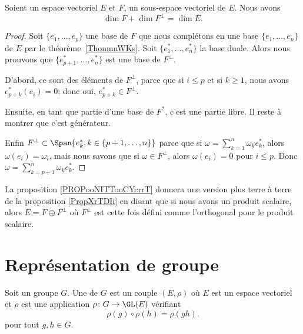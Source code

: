\begin{proposition} \label{PropXrTDIi}
	Soient un espace vectoriel \( E\) et \( F\), un sous-espace vectoriel de \( E\). Nous avons
	\begin{equation}
		\dim F+\dim F^{\perp}=\dim E.
	\end{equation}
\end{proposition}

\begin{proof}
	Soit \( \{ e_1,\ldots, e_p \}\) une base de \( F\) que nous complétons en une base \( \{ e_1,\ldots, e_n \}\) de \( E\) par le théorème~\ref{ThonmnWKs}. Soit \( \{ e_1^*,\ldots, e^*_n \}\) la base duale. Alors nous prouvons que \( \{ e^*_{p+1},\ldots, e_n^* \}\) est une base de \( F^{\perp}\).

	D'abord, ce sont des éléments de \( F^{\perp}\), parce que si \( i\leq p\) et si \( k\geq 1\), nous avons \( e^*_{p+k}(e_i)=0\); donc oui, \( e^*_{p+k}\in F^{\perp}\).

	Ensuite, en tant que partie d'une base de \( F^*\), c'est une partie libre. Il reste à montrer que c'est générateur.


	Enfin \( F^{\perp}\subset\Span\{ e_{k}^*, k \in \{p+1, \dots, n\}\}\) parce que si \( \omega=\sum_{k=1}^n\omega_ke_k^*\), alors \( \omega(e_i)=\omega_i\), mais nous savons que si \( \omega\in F^{\perp}\), alors \( \omega(e_i)=0\) pour \( i\leq p\). Donc \( \omega=\sum_{k=p+1}^n\omega_ke^*_k\).
\end{proof}

La proposition \ref{PROPooNITTooCYcrrT} donnera une version plus terre à terre de la proposition \ref{PropXrTDIi} en disant que si nous avons un produit scalaire, alors \( E=F\oplus F^{\perp}\) où \( F^{\perp}\) est cette fois défini comme l'orthogonal pour le produit scalaire.

\section{Représentation de groupe}

\begin{definition}[Représentation]      \label{DEFooXVMSooXDIfZV}
	Soit un groupe \( G\). Une  de \( G\) est un couple \( (E,\rho)\) où \( E\) est un espace vectoriel et \( \rho\) est une application \( \rho\colon G\to \GL(E)\) vérifiant
	\begin{equation}
		\rho(g)\circ\rho(h)=\rho(gh).
	\end{equation}
	pour tout \( g,h\in G\).
\end{definition}

